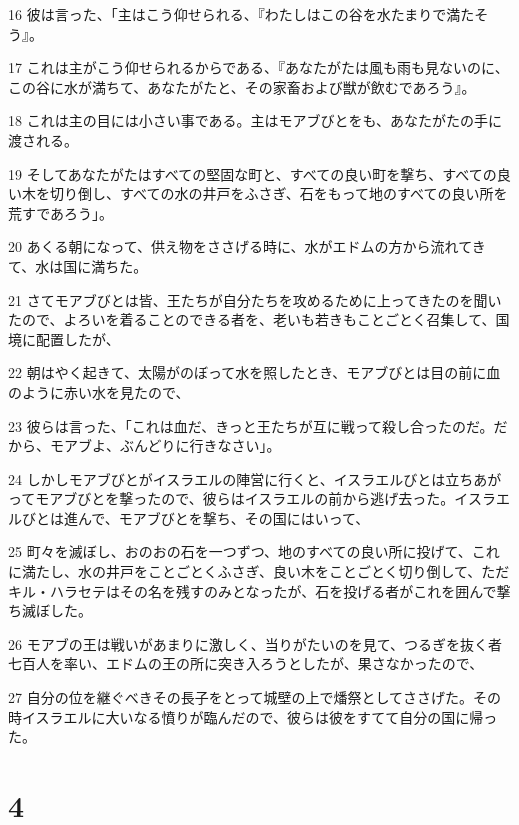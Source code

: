 \par 16 彼は言った、「主はこう仰せられる、『わたしはこの谷を水たまりで満たそう』。
\par 17 これは主がこう仰せられるからである、『あなたがたは風も雨も見ないのに、この谷に水が満ちて、あなたがたと、その家畜および獣が飲むであろう』。
\par 18 これは主の目には小さい事である。主はモアブびとをも、あなたがたの手に渡される。
\par 19 そしてあなたがたはすべての堅固な町と、すべての良い町を撃ち、すべての良い木を切り倒し、すべての水の井戸をふさぎ、石をもって地のすべての良い所を荒すであろう」。
\par 20 あくる朝になって、供え物をささげる時に、水がエドムの方から流れてきて、水は国に満ちた。
\par 21 さてモアブびとは皆、王たちが自分たちを攻めるために上ってきたのを聞いたので、よろいを着ることのできる者を、老いも若きもことごとく召集して、国境に配置したが、
\par 22 朝はやく起きて、太陽がのぼって水を照したとき、モアブびとは目の前に血のように赤い水を見たので、
\par 23 彼らは言った、「これは血だ、きっと王たちが互に戦って殺し合ったのだ。だから、モアブよ、ぶんどりに行きなさい」。
\par 24 しかしモアブびとがイスラエルの陣営に行くと、イスラエルびとは立ちあがってモアブびとを撃ったので、彼らはイスラエルの前から逃げ去った。イスラエルびとは進んで、モアブびとを撃ち、その国にはいって、
\par 25 町々を滅ぼし、おのおの石を一つずつ、地のすべての良い所に投げて、これに満たし、水の井戸をことごとくふさぎ、良い木をことごとく切り倒して、ただキル・ハラセテはその名を残すのみとなったが、石を投げる者がこれを囲んで撃ち滅ぼした。
\par 26 モアブの王は戦いがあまりに激しく、当りがたいのを見て、つるぎを抜く者七百人を率い、エドムの王の所に突き入ろうとしたが、果さなかったので、
\par 27 自分の位を継ぐべきその長子をとって城壁の上で燔祭としてささげた。その時イスラエルに大いなる憤りが臨んだので、彼らは彼をすてて自分の国に帰った。

\chapter{4}


